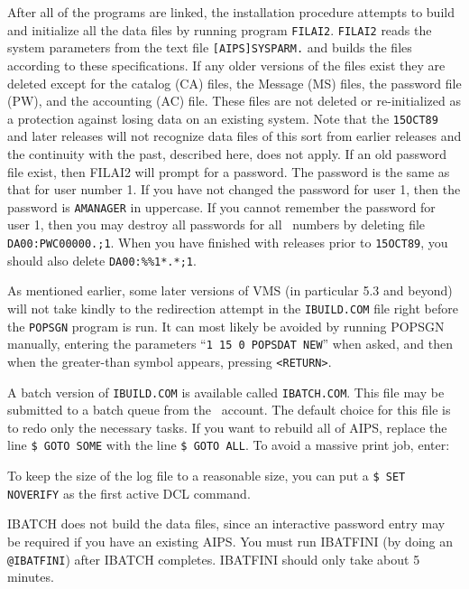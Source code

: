     After all of the programs are linked, the installation procedure
attempts to build and initialize all the data files by running program
{\tt FILAI2}.  {\tt FILAI2} reads the system parameters from the text file
{\tt [AIPS]SYSPARM.} and builds the files according to these specifications.
If any older versions of the files exist they are deleted except for
the catalog (CA) files, the Message (MS) files, the password file (PW),
and the accounting (AC) file.  These files are not deleted or
re-initialized as a protection against losing data on an existing
system.  Note that the {\tt 15OCT89} and later releases will not recognize
data files of this sort from earlier releases and the continuity with
the past, described here, does not apply.  If an old password file
exist, then FILAI2 will prompt for a password.  The password is the
same as that for user number 1.  If you have not changed the password
for user 1, then the password is {\tt AMANAGER} in uppercase.  If you cannot
remember the password for user 1, then you may destroy all passwords
for all \aips\ numbers by deleting file {\tt DA00:PWC00000.;1}.  When you have
finished with releases prior to {\tt 15OCT89}, you should also delete
{\tt DA00:\%\%1*.*;1}.

As mentioned earlier, some later versions of VMS (in particular 5.3
and beyond) will not take kindly to the redirection attempt in the
{\tt IBUILD.COM} file right before the {\tt POPSGN} program is run.
It can most likely be avoided by running POPSGN manually, entering the
parameters ``{\tt 1 15 0 POPSDAT NEW}'' when asked, and then when the
greater-than symbol appears, pressing {\tt <RETURN>}.

\medskip{}

A batch version of {\tt IBUILD.COM} is available called {\tt IBATCH.COM}.  This
file may be submitted to a batch queue from the \aips\ account.  The
default choice for this file is to redo only the necessary tasks.  If
you want to rebuild all of AIPS, replace the line {\tt\$ GOTO SOME} with
the line {\tt\$ GOTO ALL}.  To avoid a massive print job, enter:\medskip

\medskip

\noindent
To keep the size of the log file to a reasonable size, you can put a
{\tt\$ SET NOVERIFY} as the first active DCL command.

IBATCH does not build the data files, since an interactive password
entry may be required if you have an existing AIPS.  You must run
IBATFINI (by doing an {\tt @IBATFINI}) after IBATCH completes.  IBATFINI
should only take about 5 minutes.

